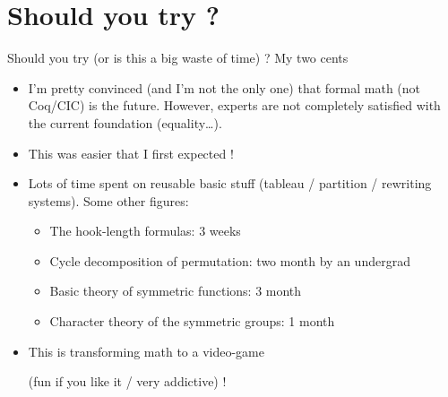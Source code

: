 \documentclass[compress,11pt]{beamer}
\begin{document}
\section{Should you try ?}

\begin{frame}{Should you try {\tiny(or is this a big waste of time)} ? My two cents}

  \begin{itemize}
  \item I'm pretty convinced (and I'm not the only one) that formal math (not
    Coq/CIC) is the future. However, experts are not completely satisfied with
    the current foundation (equality\dots). \bigskip\pause

  \item This was easier that I first expected !
    \bigskip\pause

  \item Lots of time spent on reusable basic stuff (tableau / partition /
    rewriting systems). Some other figures:
    \begin{itemize}
    \item The hook-length formulas: 3 weeks
    \item Cycle decomposition of permutation: two month by an undergrad
    \item Basic theory of symmetric functions: 3 month
    \item Character theory of the symmetric groups: 1 month
    \end{itemize}
    \bigskip\pause

  \item This is transforming math to a video-game

    (fun if you like it / very addictive) !
  \end{itemize}
\end{frame}
\end{document}
